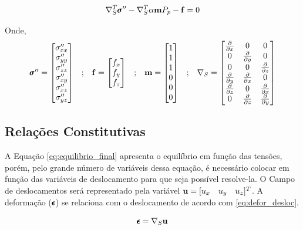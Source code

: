 \begin{equation}
\label{eq:equilibrio_final}
\sopnabla^T \stef - \sopnabla^T\alpha \mathbf{m}  P_p - \mathbf{f} = 0
\end{equation}

Onde,
\begin{equation}
\begin{matrix}\label{eq:definicoesvoigt}
\pmb{\sigma}^{\prime\prime} = \begin{bmatrix}
\sigma^{\prime\prime}_{xx}
\\
\sigma^{\prime\prime}_{yy}
\\
\sigma^{\prime\prime}_{zz}
\\
\sigma^{\prime\prime}_{xy}
\\
\sigma^{\prime\prime}_{xz}
\\
\sigma^{\prime\prime}_{yz}
\end{bmatrix}
&

;

&

\mathbf{f} = \begin{bmatrix}
f_{x}
\\
f_{y}
\\
f_{z}
\end{bmatrix}
&
;
&

\mathbf{m} = \begin{bmatrix} 1 \\ 1 \\ 1 \\ 0 \\ 0 \\ 0\end{bmatrix}

&
;

&
\nabla_S = \begin{bmatrix} \frac{\partial { }}{\partial x} & 0 & 0 \\ 0 & \frac{\partial { }}{\partial y} & 0 \\ 0 & 0 & \frac{\partial { }}{\partial z} \\ \frac{\partial { }}{\partial y} & \frac{\partial { }}{\partial x} & 0 \\ \frac{\partial { }}{\partial z} & 0 & \frac{\partial { }}{\partial x} \\ 0 & \frac{\partial { }}{\partial z} & \frac{\partial { }}{\partial y} \end{bmatrix}
\end{matrix}
\end{equation}



\subsection{Relações Constitutivas}

A Equação \eqref{eq:equilibrio_final} apresenta o equilíbrio em função das tensões, porém, pelo grande número de variáveis dessa equação, é necessário colocar em função das variáveis de deslocamento para que seja possível resolve-la. O Campo de deslocamentos será representado pela variável $\mathbf{u} = [u_x \quad u_y \quad u_z]^T$. A deformação ($\pmb{\epsilon}$) se relaciona com o deslocamento de acordo com \eqref{eq:defor_desloc}. 

\begin{equation}
\label{eq:defor_desloc}
\deformacao = \sopnabla \deslocamento
\end{equation}



